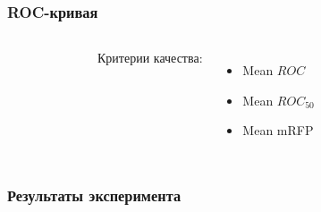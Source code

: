 \documentclass{beamer}
\begin{document}
\begin{frame}
\frametitle{ROC-кривая}
\begin{columns}
    \begin{figure}[h]
    \end{figure}

    Критерии качества:
    \begin{itemize}
        \item Mean $ROC$
        \item Mean $ROC_{50}$
        \item Mean mRFP
    \end{itemize}
\end{columns}
\end{frame}

\begin{frame}
\frametitle{Результаты эксперимента}
    \begin{figure}[h]
    \end{figure}
\end{frame}
\end{document}
